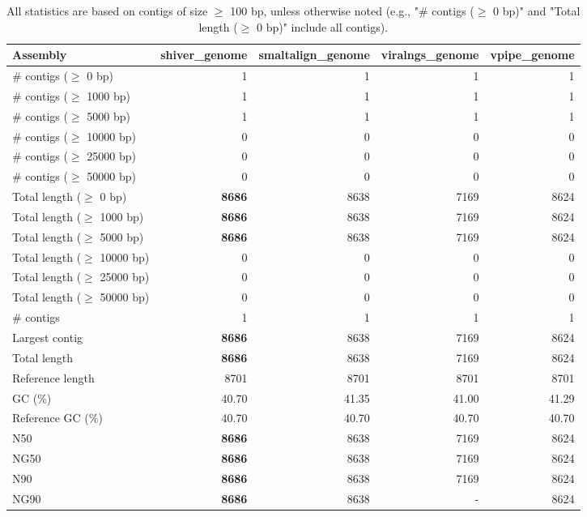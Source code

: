 \documentclass[12pt,a4paper]{article}
\begin{document}
\begin{table}[ht]
\begin{center}
\caption{All statistics are based on contigs of size $\geq$ 100 bp, unless otherwise noted (e.g., "\# contigs ($\geq$ 0 bp)" and "Total length ($\geq$ 0 bp)" include all contigs).}
\begin{tabular}{|l*{4}{|r}|}
\hline
Assembly & shiver\_genome & smaltalign\_genome & viralngs\_genome & vpipe\_genome \\ \hline
\# contigs ($\geq$ 0 bp) & 1 & 1 & 1 & 1 \\ \hline
\# contigs ($\geq$ 1000 bp) & 1 & 1 & 1 & 1 \\ \hline
\# contigs ($\geq$ 5000 bp) & 1 & 1 & 1 & 1 \\ \hline
\# contigs ($\geq$ 10000 bp) & 0 & 0 & 0 & 0 \\ \hline
\# contigs ($\geq$ 25000 bp) & 0 & 0 & 0 & 0 \\ \hline
\# contigs ($\geq$ 50000 bp) & 0 & 0 & 0 & 0 \\ \hline
Total length ($\geq$ 0 bp) & {\bf 8686} & 8638 & 7169 & 8624 \\ \hline
Total length ($\geq$ 1000 bp) & {\bf 8686} & 8638 & 7169 & 8624 \\ \hline
Total length ($\geq$ 5000 bp) & {\bf 8686} & 8638 & 7169 & 8624 \\ \hline
Total length ($\geq$ 10000 bp) & 0 & 0 & 0 & 0 \\ \hline
Total length ($\geq$ 25000 bp) & 0 & 0 & 0 & 0 \\ \hline
Total length ($\geq$ 50000 bp) & 0 & 0 & 0 & 0 \\ \hline
\# contigs & 1 & 1 & 1 & 1 \\ \hline
Largest contig & {\bf 8686} & 8638 & 7169 & 8624 \\ \hline
Total length & {\bf 8686} & 8638 & 7169 & 8624 \\ \hline
Reference length & 8701 & 8701 & 8701 & 8701 \\ \hline
GC (\%) & 40.70 & 41.35 & 41.00 & 41.29 \\ \hline
Reference GC (\%) & 40.70 & 40.70 & 40.70 & 40.70 \\ \hline
N50 & {\bf 8686} & 8638 & 7169 & 8624 \\ \hline
NG50 & {\bf 8686} & 8638 & 7169 & 8624 \\ \hline
N90 & {\bf 8686} & 8638 & 7169 & 8624 \\ \hline
NG90 & {\bf 8686} & 8638 & - & 8624 \\ \hline

\end{tabular}
\end{center}
\end{table}
\end{document}
